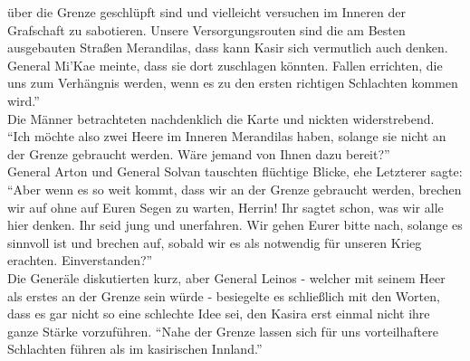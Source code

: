 über die Grenze geschlüpft sind und vielleicht versuchen im Inneren der Grafschaft zu sabotieren. 
Unsere Versorgungsrouten sind die am Besten ausgebauten Straßen Merandilas, dass kann Kasir sich 
vermutlich auch denken. General Mi'Kae meinte, dass sie dort zuschlagen könnten. Fallen errichten, 
die uns zum Verhängnis werden, wenn es zu den ersten richtigen Schlachten kommen wird.''\\
Die Männer betrachteten nachdenklich die Karte und nickten widerstrebend.\\
``Ich möchte also zwei Heere im Inneren Merandilas haben, solange sie nicht an der Grenze gebraucht 
werden. Wäre jemand von Ihnen dazu bereit?''\\
General Arton und General Solvan tauschten flüchtige Blicke, ehe Letzterer sagte: ``Aber wenn es so 
weit kommt, dass wir an der Grenze gebraucht werden, brechen wir auf ohne auf Euren Segen zu 
warten, Herrin! Ihr sagtet schon, was wir alle hier denken. Ihr seid jung und unerfahren. Wir gehen 
Eurer bitte nach, solange es sinnvoll ist und brechen auf, sobald wir es als notwendig für unseren 
Krieg erachten. Einverstanden?''\\
Die Generäle diskutierten kurz, aber General Leinos - welcher mit seinem Heer als erstes an der 
Grenze sein würde - besiegelte es schließlich mit den Worten, dass es gar nicht so eine schlechte 
Idee sei, den Kasira erst einmal nicht ihre ganze Stärke vorzuführen. ``Nahe der Grenze lassen 
sich für uns vorteilhaftere Schlachten führen als im kasirischen Innland.''\\


